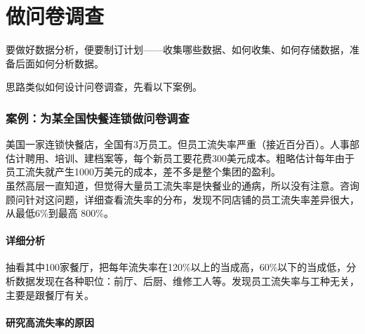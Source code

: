 
\chapter{做问卷调查} %


要做好数据分析，便要制订计划——收集哪些数据、如何收集、如何存储数据，准备后面如何分析数据。

思路类似如何设计问卷调查，先看以下案例。

\hypertarget{ux6848ux4f8bux4e3aux67d0ux5168ux56fdux5febux9910ux8fdeux9501ux505aux95eeux5377ux8c03ux67e5}{%
\subsection{案例：为某全国快餐连锁做问卷调查}\label{ux6848ux4f8bux4e3aux67d0ux5168ux56fdux5febux9910ux8fdeux9501ux505aux95eeux5377ux8c03ux67e5}}

美国一家连锁快餐店，全国有3万员工。但员工流失率严重（接近百分百）。人事部估计聘用、培训、建档案等，每个新员工要花费300美元成本。粗略估计每年由于员工流失就产生1000万美元的成本，差不多是整个集团的盈利。\\
虽然高层一直知道，但觉得大量员工流失率是快餐业的通病，所以没有注意。咨询顾问针对这问题，详细查看流失率的分布，发现不同店铺的员工流失率差异很大，从最低6\%到最高
800\%。\\


\hypertarget{ux4eceux5206ux6790ux5230ux884cux52a8}{%
\subsubsection{详细分析}\label{ux4eceux5206ux6790ux5230ux884cux52a8}}

抽看其中100家餐厅，把每年流失率在120\%以上的当成高，60\%以下的当成低，分析数据发现在各种职位：前厅、后厨、维修工人等。发现员工流失率与工种无关，主要是跟餐厅有关。\\

\hypertarget{ux4eceux5206ux6790ux5230ux884cux52a8}{%
\subsubsection{研究高流失率的原因}\label{ux4eceux5206ux6790ux5230ux884cux52a8}}

